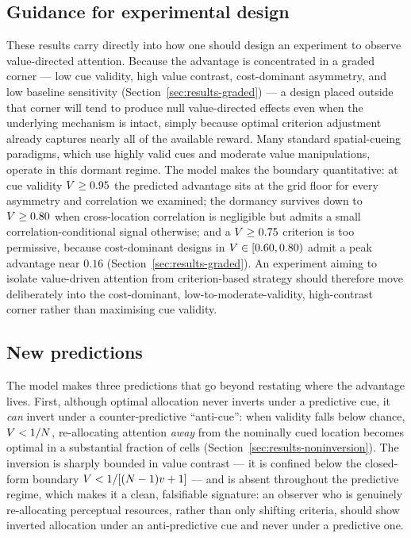 \subsection*{Guidance for experimental design}

These results carry directly into how one should design an experiment to
observe value-directed attention. Because the advantage is concentrated
in a graded corner --- low cue validity, high value contrast,
cost-dominant asymmetry, and low baseline sensitivity
(Section~\ref{sec:results-graded}) --- a design placed outside that
corner will tend to produce null value-directed effects even when the
underlying mechanism is intact, simply because optimal criterion
adjustment already captures nearly all of the available reward. Many
standard spatial-cueing paradigms, which use highly valid cues and
moderate value manipulations, operate in this dormant regime. The model
makes the boundary quantitative: at cue validity $V \ge 0.95$ the
predicted advantage sits at the grid floor for every asymmetry and
correlation we examined; the dormancy survives down to $V \ge 0.80$
when cross-location correlation is negligible but admits a small
correlation-conditional signal otherwise; and a $V \ge 0.75$
criterion is too permissive, because cost-dominant designs in
$V \in [0.60, 0.80)$ admit a peak advantage near $0.16$
(Section~\ref{sec:results-graded}). An experiment aiming to isolate
value-driven attention from criterion-based strategy should therefore
move deliberately into the cost-dominant, low-to-moderate-validity,
high-contrast corner rather than maximising cue validity.

\subsection*{New predictions}

The model makes three predictions that go beyond restating where the
advantage lives. First, although optimal allocation never inverts under a
predictive cue, it \emph{can} invert under a counter-predictive
``anti-cue'': when validity falls below chance, $V < 1/N$,
re-allocating attention \emph{away} from the nominally cued location
becomes optimal in a substantial fraction of cells
(Section~\ref{sec:results-noninversion}). The inversion is sharply
bounded in value contrast --- it is confined below the closed-form
boundary $V < 1/[(N-1)v + 1]$ --- and is absent throughout
the predictive regime, which makes it a clean, falsifiable signature: an
observer who is genuinely re-allocating perceptual resources, rather than
only shifting criteria, should show inverted allocation under an
anti-predictive cue and never under a predictive one.

